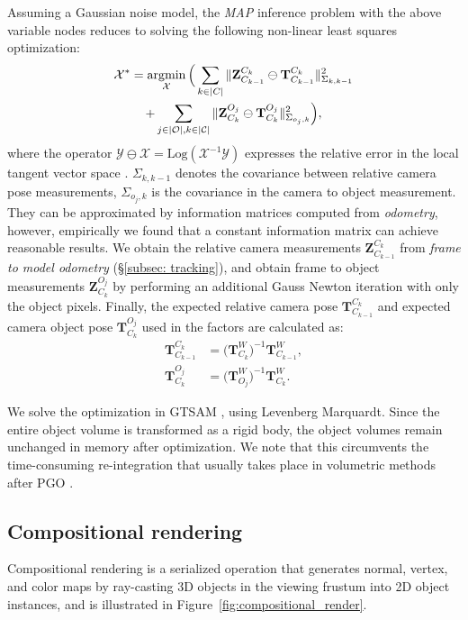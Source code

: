 Assuming a Gaussian noise model, the \textit{MAP} inference problem with the above variable nodes reduces to solving the following non-linear least squares optimization:
\begin{multline}
    \mathcal{X}^* = \operatorname*{\arg\!\min}_{\mathcal{X}} \Big( \sum_{k \in |C|} \|  \mathbf{Z}^{C_k}_{C_{k-1}} \ominus \mathbf{T}^{C_k}_{C_{k-1}} \|_{\Sigma_{k,k-1}}^2 \\
    + \sum_{j \in |\mathcal{O}|, k \in |\mathcal{C}|} \| \mathbf{Z}^{O_j}_{C_k} \ominus \mathbf{T}^{O_j}_{C_k} \|_{\Sigma_{o_j, k}}^2 \Big),
\end{multline}
where the operator $ \mathcal{Y} \ominus \mathcal{X} = \text{Log}(\mathcal{X}^{-1} \mathcal{Y})$ expresses the relative error in the local tangent vector space \cite{solaMicroLieTheory2020}. $\Sigma_{k, k-1}$ denotes the covariance between relative camera pose measurements,  $\Sigma_{o_j, k}$ is the covariance in the camera to object measurement. They can be approximated by information matrices computed from \textit{odometry}, however, empirically we found that a constant information matrix can achieve reasonable results. We obtain the relative camera measurements $\mathbf{Z}^{C_k}_{C_{k-1}}$ from \textit{frame to model odometry} (\S\ref{subsec: tracking}), and obtain frame to object measurements $\mathbf{Z}^{O_j}_{C_k}$ by performing an additional Gauss Newton iteration with only the object pixels. Finally, the expected relative camera pose $\mathbf{T}^{C_k}_{C_{k-1}}$ and expected camera object pose $\mathbf{T}^{O_j}_{C_k}$ used in the factors are calculated as:
\begin{align}
    \mathbf{T}^{C_k}_{C_{k-1}} &= \bigg({\mathbf{T}^{W}_{C_k}}\bigg)^{-1} \mathbf{T}^{W}_{C_{k-1}}, \\
    \mathbf{T}^{O_j}_{C_k} &= \bigg({\mathbf{T}^{W}_{O_j}}\bigg)^{-1} \mathbf{T}^{W}_{C_k}.
\end{align}

We solve the optimization in GTSAM \cite{dellaert2012factor}, using Levenberg Marquardt. Since the entire object volume is transformed as a rigid body, the object volumes remain unchanged in memory after optimization. We note that this circumvents the time-consuming re-integration that usually takes place in volumetric methods after PGO \cite{whelanElasticFusionDenseSLAM2015}.

\subsection{Compositional rendering} \label{subsec: rendering}
Compositional rendering is a serialized operation that generates normal, vertex, and color maps by ray-casting 3D objects in the viewing frustum into 2D object instances, and is illustrated in Figure~\ref{fig:compositional_render}.

